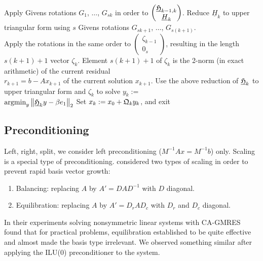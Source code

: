 \documentclass{scrartcl}
\newcommand{\norm}[1]{\left\lVert#1\right\rVert}
\begin{document}
\begin{algorithm}[H]
\begin{algorithmic}[1]
			\STATE Apply Givens rotations $G_1$, $\ldots$, $G_{sk}$ in order to $\begin{pmatrix}
	\underline{\frak{H}}_{k - 1,k} \\
	\underline{H}_k \\
\end{pmatrix}$.
			\STATE Reduce $\underline{H}_k$ to upper triangular form using $s$ Givens rotations $G_{sk + 1}$, $\ldots$, $G_{s(k + 1)}$. \\
\hspace{\algorithmicindent} Apply the rotations in the same order to $\begin{pmatrix}
	\zeta_{k - 1} \\
	0_s
\end{pmatrix}$, resulting in the length \\
\hspace{\algorithmicindent} \mbox{$s(k + 1) + 1$} vector $\zeta_k$.
		\ENDIF
	\STATE Element $s(k + 1) + 1$ of $\zeta_k$ is the 2-norm (in exact arithmetic) of the current residual \\
\hspace{\algorithmicindent} $r_{k + 1} = b - Ax_{k + 1}$ of the current solution $x_{k + 1}$.
		\STATE Use the above reduction of $\underline{\frak{H}}_k$ to upper triangular form and $\zeta_k$ to solve $y_k :=$ \\ \hspace{\algorithmicindent} $\text{argmin}_{y} \norm{\underline{\frak{H}}_k y - \beta e_1}_2$
		\STATE Set $x_k := x_0 + \frak{Q}_k y_k$, and exit
	\ENDIF
	\ENDFOR 
\end{algorithmic}
\end{algorithm}

\subsection{Preconditioning}
Left, right, split, we consider left preconditioning ($M^{-1}Ax = M^{-1}b$) only.
Scaling is a special type of preconditioning. \cite{Hoemmen:2010:CKS:1970638} considered two types of scaling in order to prevent rapid basis vector growth:
\begin{enumerate}
\item Balancing: replacing $A$ by $A' = DAD^{-1}$ with $D$ diagonal.
\item Equilibration: replacing $A$ by $A' = D_rAD_c$ with $D_r$ and $D_c$ diagonal.
\end{enumerate}
In their experiments solving nonsymmetric linear systems with CA-GMRES \cite{Hoemmen:2010:CKS:1970638} found that for practical problems, equilibration established to be quite effective and almost made the basis type irrelevant. We observed something similar after applying the ILU(0) preconditioner to the system.
\end{document}
